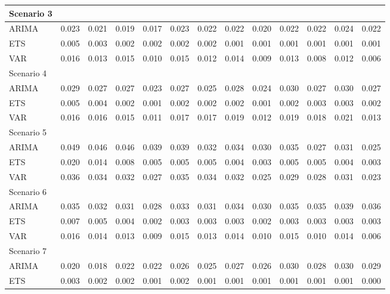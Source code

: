 \documentclass[a4paper,preprint,11pt,authoryear]{elsarticle}
\begin{document}
\begin{table}
{\begin{tabular}{lrrrrrrrrrrrr}
      \hline
      Scenario 3 & & & & & & & & & & & & \\
      \hline
      ARIMA & 0.023 & 0.021 & 0.019 & 0.017 & 0.023 & 0.022 & 0.022 & 0.020 & 0.022 & 0.022 & 0.024 & 0.022 \\
      ETS & 0.005 & 0.003 & 0.002 & 0.002 & 0.002 & 0.002 & 0.001 & 0.001 & 0.001 & 0.001 & 0.001 & 0.001 \\
      VAR & 0.016 & 0.013 & 0.015 & 0.010 & 0.015 & 0.012 & 0.014 & 0.009 & 0.013 & 0.008 & 0.012 & 0.006 \\
      \hline
      Scenario 4 & & & & & & & & & & & & \\
      \hline
      ARIMA & 0.029 & 0.027 & 0.027 & 0.023 & 0.027 & 0.025 & 0.028 & 0.024 & 0.030 & 0.027 & 0.030 & 0.027 \\
      ETS & 0.005 & 0.004 & 0.002 & 0.001 & 0.002 & 0.002 & 0.002 & 0.001 & 0.002 & 0.003 & 0.003 & 0.002 \\
      VAR & 0.016 & 0.016 & 0.015 & 0.011 & 0.017 & 0.017 & 0.019 & 0.012 & 0.019 & 0.018 & 0.021 & 0.013 \\
      \hline
      Scenario 5 & & & & & & & & & & & & \\
      \hline
      ARIMA & 0.049 & 0.046 & 0.046 & 0.039 & 0.039 & 0.032 & 0.034 & 0.030 & 0.035 & 0.027 & 0.031 & 0.025 \\
      ETS & 0.020 & 0.014 & 0.008 & 0.005 & 0.005 & 0.005 & 0.004 & 0.003 & 0.005 & 0.005 & 0.004 & 0.003 \\
      VAR & 0.036 & 0.034 & 0.032 & 0.027 & 0.035 & 0.034 & 0.032 & 0.025 & 0.029 & 0.028 & 0.031 & 0.023 \\
      \hline
      Scenario 6 & & & & & & & & & & & & \\
      \hline
      ARIMA & 0.035 & 0.032 & 0.031 & 0.028 & 0.033 & 0.031 & 0.034 & 0.030 & 0.035 & 0.035 & 0.039 & 0.036 \\
      ETS & 0.007 & 0.005 & 0.004 & 0.002 & 0.003 & 0.003 & 0.003 & 0.002 & 0.003 & 0.003 & 0.003 & 0.003 \\
      VAR & 0.016 & 0.014 & 0.013 & 0.009 & 0.015 & 0.013 & 0.014 & 0.010 & 0.015 & 0.010 & 0.014 & 0.006 \\
      \hline
      Scenario 7 & & & & & & & & & & & & \\
      \hline
      ARIMA & 0.020 & 0.018 & 0.022 & 0.022 & 0.026 & 0.025 & 0.027 & 0.026 & 0.030 & 0.028 & 0.030 & 0.029 \\
      ETS & 0.003 & 0.002 & 0.002 & 0.001 & 0.002 & 0.001 & 0.001 & 0.001 & 0.001 & 0.001 & 0.001 & 0.000 \\

\end{tabular}}
\end{table}
\end{document}
